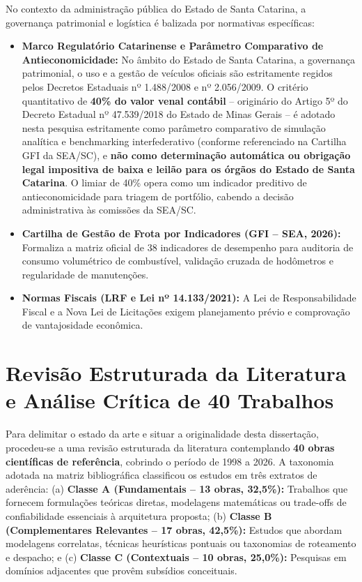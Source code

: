 No contexto da administração pública do Estado de Santa Catarina, a governança patrimonial e logística é balizada por normativas específicas:
\begin{itemize}
    \item \textbf{Marco Regulatório Catarinense e Parâmetro Comparativo de Antieconomicidade:} No âmbito do Estado de Santa Catarina, a governança patrimonial, o uso e a gestão de veículos oficiais são estritamente regidos pelos Decretos Estaduais nº 1.488/2008 e nº 2.056/2009. O critério quantitativo de \textbf{40\% do valor venal contábil} -- originário do Artigo 5º do Decreto Estadual nº 47.539/2018 do Estado de Minas Gerais -- é adotado nesta pesquisa estritamente como parâmetro comparativo de simulação analítica e benchmarking interfederativo (conforme referenciado na Cartilha GFI da SEA/SC), e \textbf{não como determinação automática ou obrigação legal impositiva de baixa e leilão para os órgãos do Estado de Santa Catarina}. O limiar de 40\% opera como um indicador preditivo de antieconomicidade para triagem de portfólio, cabendo a decisão administrativa às comissões da SEA/SC.
    \item \textbf{Cartilha de Gestão de Frota por Indicadores (GFI -- SEA, 2026):} Formaliza a matriz oficial de 38 indicadores de desempenho para auditoria de consumo volumétrico de combustível, validação cruzada de hodômetros e regularidade de manutenções.
    \item \textbf{Normas Fiscais (LRF e Lei nº 14.133/2021):} A Lei de Responsabilidade Fiscal e a Nova Lei de Licitações exigem planejamento prévio e comprovação de vantajosidade econômica.
\end{itemize}

\section{Revisão Estruturada da Literatura e Análise Crítica de 40 Trabalhos}

Para delimitar o estado da arte e situar a originalidade desta dissertação, procedeu-se a uma revisão estruturada da literatura contemplando \textbf{40 obras científicas de referência}, cobrindo o período de 1998 a 2026. A taxonomia adotada na matriz bibliográfica classificou os estudos em três extratos de aderência:
(a) \textbf{Classe A (Fundamentais -- 13 obras, 32,5\%):} Trabalhos que fornecem formulações teóricas diretas, modelagens matemáticas ou trade-offs de confiabilidade essenciais à arquitetura proposta;
(b) \textbf{Classe B (Complementares Relevantes -- 17 obras, 42,5\%):} Estudos que abordam modelagens correlatas, técnicas heurísticas pontuais ou taxonomias de roteamento e despacho; e
(c) \textbf{Classe C (Contextuais -- 10 obras, 25,0\%):} Pesquisas em domínios adjacentes que provêm subsídios conceituais.

